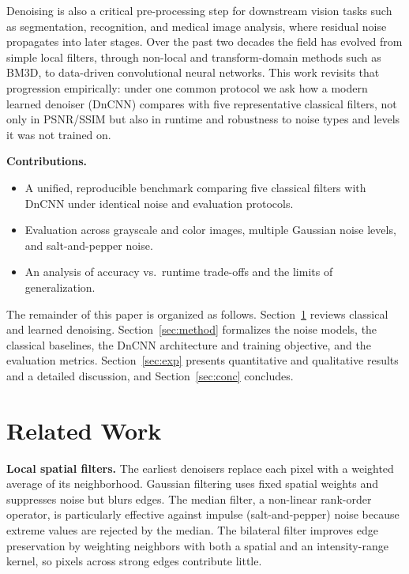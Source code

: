 \documentclass[conference]{IEEEtran}
\begin{document}
Denoising is also a critical pre-processing step for downstream vision tasks
such as segmentation, recognition, and medical image analysis, where residual
noise propagates into later stages. Over the past two decades the field has
evolved from simple local filters, through non-local and transform-domain
methods such as BM3D, to data-driven convolutional neural networks. This work
revisits that progression empirically: under one common protocol we ask how a
modern learned denoiser (DnCNN) compares with five representative classical
filters, not only in PSNR/SSIM but also in runtime and robustness to noise
types and levels it was not trained on.

\noindent\textbf{Contributions.}
\begin{itemize}
\item A unified, reproducible benchmark comparing five classical filters with DnCNN
under identical noise and evaluation protocols.
\item Evaluation across grayscale and color images, multiple Gaussian noise levels,
and salt-and-pepper noise.
\item An analysis of accuracy vs.\ runtime trade-offs and the limits of generalization.
\end{itemize}

The remainder of this paper is organized as follows. Section~\ref{sec:rw}
reviews classical and learned denoising. Section~\ref{sec:method} formalizes the
noise models, the classical baselines, the DnCNN architecture and training
objective, and the evaluation metrics. Section~\ref{sec:exp} presents
quantitative and qualitative results and a detailed discussion, and
Section~\ref{sec:conc} concludes.

\section{Related Work}\label{sec:rw}
\textbf{Local spatial filters.} The earliest denoisers replace each pixel with a
weighted average of its neighborhood. Gaussian filtering uses fixed spatial
weights and suppresses noise but blurs edges. The median filter, a non-linear
rank-order operator, is particularly effective against impulse (salt-and-pepper)
noise because extreme values are rejected by the median. The bilateral filter
\cite{tomasi1998} improves edge preservation by weighting neighbors with both a
spatial and an intensity-range kernel, so pixels across strong edges contribute
little.
\end{document}

